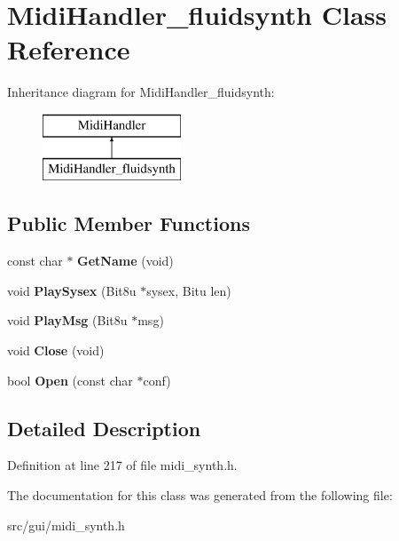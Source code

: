\hypertarget{classMidiHandler__fluidsynth}{\section{Midi\-Handler\-\_\-fluidsynth Class Reference}
\label{classMidiHandler__fluidsynth}
}
Inheritance diagram for Midi\-Handler\-\_\-fluidsynth\-:\begin{figure}[H]
\begin{center}
\leavevmode
\includegraphics[height=2.000000cm]{classMidiHandler__fluidsynth}
\end{center}
\end{figure}
\subsection*{Public Member Functions}
\begin{DoxyCompactItemize}
\item 
\hypertarget{classMidiHandler__fluidsynth_af0d91c54df902abc0e993220f248900e}{const char $\ast$ {\bfseries Get\-Name} (void)}\label{classMidiHandler__fluidsynth_af0d91c54df902abc0e993220f248900e}

\item 
\hypertarget{classMidiHandler__fluidsynth_aaae1174f85fd79d1d5e692aecbac279b}{void {\bfseries Play\-Sysex} (Bit8u $\ast$sysex, Bitu len)}\label{classMidiHandler__fluidsynth_aaae1174f85fd79d1d5e692aecbac279b}

\item 
\hypertarget{classMidiHandler__fluidsynth_a3406b315a986be61547b4fed13935713}{void {\bfseries Play\-Msg} (Bit8u $\ast$msg)}\label{classMidiHandler__fluidsynth_a3406b315a986be61547b4fed13935713}

\item 
\hypertarget{classMidiHandler__fluidsynth_af868fb2224b6520d90260ef1cb20633c}{void {\bfseries Close} (void)}\label{classMidiHandler__fluidsynth_af868fb2224b6520d90260ef1cb20633c}

\item 
\hypertarget{classMidiHandler__fluidsynth_aae61797cb4063e23eacb96b1c5ec505c}{bool {\bfseries Open} (const char $\ast$conf)}\label{classMidiHandler__fluidsynth_aae61797cb4063e23eacb96b1c5ec505c}

\end{DoxyCompactItemize}


\subsection{Detailed Description}


Definition at line 217 of file midi\-\_\-synth.\-h.



The documentation for this class was generated from the following file\-:\begin{DoxyCompactItemize}
\item 
src/gui/midi\-\_\-synth.\-h\end{DoxyCompactItemize}
